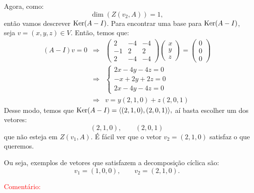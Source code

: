 \documentclass[11pt,a4paper]{article}
\begin{document}
{\medskip
\noindent
Agora, como:
\[
\dim(Z(v_2,A))=1,
\]
então vamos descrever $\operatorname{Ker}(A - I)$. Para encontrar uma base para $\operatorname{Ker}(A - I)$, seja $v = (x, y, z) \in V.$ Então, temos que:
\[
\begin{array}{rcl}
(A - I)v = 0 &\Rightarrow& \begin{pmatrix}
2 & -4 & -4 \\
-1 & 2 & 2 \\
2 & -4 & -4
\end{pmatrix} \begin{pmatrix}
x \\ y \\ z
\end{pmatrix} = \begin{pmatrix}
0 \\ 0 \\ 0
\end{pmatrix} \\&\Rightarrow& \begin{cases}
2x-4y-4z = 0 \\
-x+2y+2z = 0 \\
2x-4y-4z = 0
\end{cases} \\&\Rightarrow& v = y(2,1,0)+z(2,0,1)
\end{array}
\]
Desse modo, temos que $\operatorname{Ker}(A - I) = \langle (2,1,0),(2,0,1) \rangle,$ aí basta escolher um dos vetores:
\[
(2,1,0),\quad\quad(2,0,1)
\]
que não esteja em $Z(v_1,A)$. É fácil ver que o vetor $v_2=(2,1,0)$ satisfaz o que queremos.

\medskip
\noindent
Ou seja, exemplos de vetores que satisfazem a decomposição cíclica são:
\[
v_1=(1,0,0),\quad\quad v_2=(2,1,0).
\]
}

\medskip
\noindent
\textcolor{red}{Comentário:}
\end{document}
